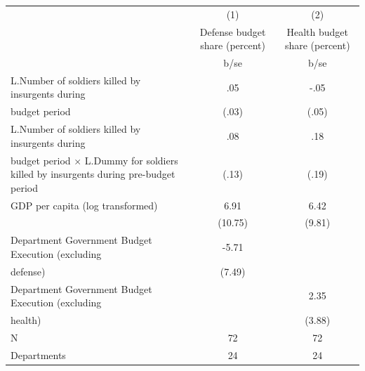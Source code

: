 {
\def\sym#1{\ifmmode^{#1}\else\(^{#1}\)\fi}
\begin{tabular}{l*{2}{c}}
\hline\hline
                                                  &\multicolumn{1}{c}{(1)}&\multicolumn{1}{c}{(2)}\\
                                                  &\multicolumn{1}{c}{Defense budget share (percent)}&\multicolumn{1}{c}{Health budget share (percent)}\\
                                                  &        b/se   &        b/se   \\
\hline
L.Number of soldiers killed by insurgents during  &         .05   &        -.05   \\
budget period                                     &       (.03)   &       (.05)   \\
L.Number of soldiers killed by insurgents during  &         .08   &         .18   \\
budget period $\times$ L.Dummy for soldiers killed by insurgents during pre-budget period&       (.13)   &       (.19)   \\
GDP per capita (log transformed)                  &        6.91   &        6.42   \\
                                                  &     (10.75)   &      (9.81)   \\
Department Government Budget Execution (excluding &       -5.71   &               \\
defense)                                          &      (7.49)   &               \\
Department Government Budget Execution (excluding &               &        2.35   \\
health)                                           &               &      (3.88)   \\
\hline
N                                                 &          72   &          72   \\
Departments                                       &          24   &          24   \\
\hline\hline
\end{tabular}
}
